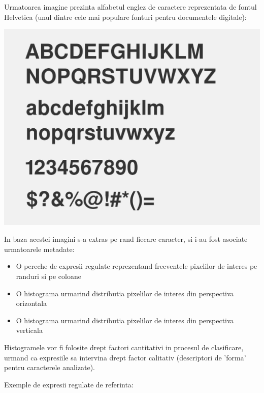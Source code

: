 \documentclass[10pt]{article}
\begin{document}
\> Urmatoarea imagine prezinta alfabetul englez de caractere reprezentata de fontul Helvetica (unul dintre cele mai populare 
fonturi pentru documentele digitale):

\begin{center}

  \includegraphics[scale=0.1]{helvetica}
  
\end{center}

\> In baza acestei imagini s-a extras pe rand fiecare caracter, si i-au fost asociate urmatoarele metadate:

\begin{itemize}

  \item O pereche de expresii regulate reprezentand frecventele pixelilor de interes pe randuri si pe coloane
  \item O histograma urmarind distributia pixelilor de interes din perspectiva orizontala
  \item O histograma urmarind distributia pixelilor de interes din perspectiva verticala
  
\end{itemize}

\> Histogramele vor fi folosite drept factori cantitativi in procesul de clasificare,
urmand ca expresiile sa intervina drept factor calitativ (descriptori de 'forma' pentru caracterele analizate).
  
\> Exemple de expresii regulate de referinta:
\end{document}
